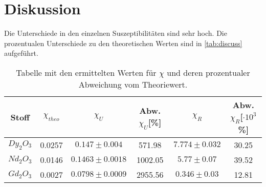 \newpage
\section{Diskussion}
\label{sec:Diskussion}

Die Unterschiede in den einzelnen Suszeptibilitäten sind sehr hoch.
Die prozentualen Unterschiede zu den theoretischen Werten sind in \autoref{tab:discuss} aufgeführt.

\begin{table}
    \centering
    \caption{Tabelle mit den ermittelten Werten für $\chi$ und deren prozentualer Abweichung vom Theoriewert.}
    \label{tab:discuss}
    \begin{tabular}{c c c c c c}
        \toprule
        Stoff & $\chi_{theo}$ & $\chi_U$ & Abw. $\chi_U$[\%] & $\chi_R$ & Abw. $\chi_R$[$\cdot 10^3$\%]\\
        \midrule
        $Dy_2O_3$ & 0.0257 & $0.147\pm 0.004$ & 571.98 & $7.774\pm 0.032$ & 30.25\\
        $Nd_2O_3$ & 0.0146 & $0.1463\pm 0.0018$ & 1002.05 & $5.77\pm 0.07$ & 39.52\\
        $Gd_2O_3$ & 0.0027 & $0.0798\pm 0.0009$ & 2955.56 & $0.346\pm 0.03$ & 12.81\\
        \bottomrule
    \end{tabular}
\end{table}